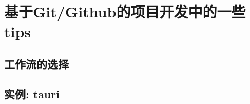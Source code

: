 \documentclass[../main.tex]{subfiles}
\begin{document}
\section{基于Git/Github的项目开发中的一些tips}

\subsection{工作流的选择}

\subsection{实例: tauri}
\end{document}
